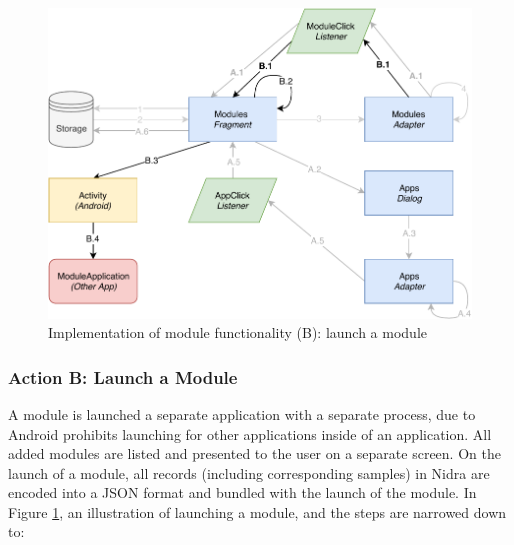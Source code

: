 \begin{figure}[!h]
    \centering
    \includegraphics[scale=0.7]{images/Module_ImpB.pdf}
    \caption{Implementation of module functionality (B): launch a module}
    \label{fig:impl_modulesB}
\end{figure}

\subsubsection{Action B: Launch a Module}
A module is launched a separate application with a separate process, due to Android prohibits launching for other applications inside of an application. All added modules are listed and presented to the user on a separate screen. On the launch of a module, all records (including corresponding samples) in Nidra are encoded into a JSON format and bundled with the launch of the module. In Figure \ref{fig:impl_modulesB}, an illustration of launching a module, and the steps are narrowed down to:

